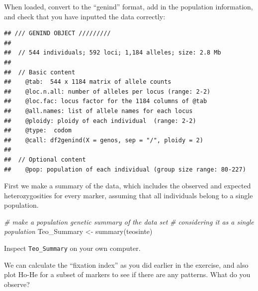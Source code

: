 \documentclass[
]{book}
\newenvironment{Shaded}{\begin{snugshade}}{\end{snugshade}}
\newcommand{\AttributeTok}[1]{\textcolor[rgb]{0.77,0.63,0.00}{#1}}
\newcommand{\CommentTok}[1]{\textcolor[rgb]{0.56,0.35,0.01}{\textit{#1}}}
\newcommand{\DecValTok}[1]{\textcolor[rgb]{0.00,0.00,0.81}{#1}}
\newcommand{\FunctionTok}[1]{\textcolor[rgb]{0.00,0.00,0.00}{#1}}
\newcommand{\NormalTok}[1]{#1}
\newcommand{\OtherTok}[1]{\textcolor[rgb]{0.56,0.35,0.01}{#1}}
\newcommand{\SpecialCharTok}[1]{\textcolor[rgb]{0.00,0.00,0.00}{#1}}
\newcommand{\StringTok}[1]{\textcolor[rgb]{0.31,0.60,0.02}{#1}}
\begin{document}
When loaded, convert to the ``genind'' format, add in the population information, and check that you have inputted the data correctly:

\begin{Shaded}
\end{Shaded}

\begin{verbatim}
## /// GENIND OBJECT /////////
## 
##  // 544 individuals; 592 loci; 1,184 alleles; size: 2.8 Mb
## 
##  // Basic content
##    @tab:  544 x 1184 matrix of allele counts
##    @loc.n.all: number of alleles per locus (range: 2-2)
##    @loc.fac: locus factor for the 1184 columns of @tab
##    @all.names: list of allele names for each locus
##    @ploidy: ploidy of each individual  (range: 2-2)
##    @type:  codom
##    @call: df2genind(X = genos, sep = "/", ploidy = 2)
## 
##  // Optional content
##    @pop: population of each individual (group size range: 80-227)
\end{verbatim}

First we make a summary of the data, which includes the observed and expected heterozygosities for every marker, assuming that all individuals belong to a single population.

\begin{Shaded}
\begin{Highlighting}[]
\CommentTok{\# make a population genetic summary of the data set}
\CommentTok{\# considering it as a single population}
\NormalTok{Teo\_Summary }\OtherTok{\textless{}{-}} \FunctionTok{summary}\NormalTok{(teosinte)}
\end{Highlighting}
\end{Shaded}

Inspect \texttt{Teo\_Summary} on your own computer.

We can calculate the ``fixation index'' as you did earlier in the exercise, and also plot Ho-He for a subset of markers to see if there are any patterns. What do you observe?
\end{document}
